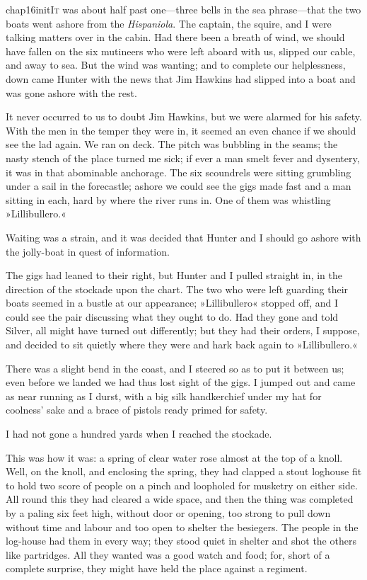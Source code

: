 
\lettrine[lines=5,image=true,findent=2pt]{chap16initI}{t} was about half past one—three bells in the sea phrase—that the two boats went ashore from the \textit{Hispaniola}. The captain, the squire, and I were talking matters over in the cabin. Had there been a breath of wind, we should have fallen on the six mutineers who were left aboard with us, slipped our cable, and away to sea. But the wind was wanting; and to complete our helplessness, down came Hunter with the news that Jim Hawkins had slipped into a boat and was gone ashore with the rest.

It never occurred to us to doubt Jim Hawkins, but we were alarmed for his safety. With the men in the temper they were in, it seemed an even chance if we should see the lad again. We ran on deck. The pitch was bubbling in the seams; the nasty stench of the place turned me sick; if ever a man smelt fever and dysentery, it was in that abominable anchorage. The six scoundrels were sitting grumbling under a sail in the forecastle; ashore we could see the gigs made fast and a man sitting in each, hard by where the river runs in. One of them was whistling »Lillibullero.«

Waiting was a strain, and it was decided that Hunter and I should go ashore with the jolly-boat in quest of information.

The gigs had leaned to their right, but Hunter and I pulled straight in, in the direction of the stockade upon the chart. The two who were left guarding their boats seemed in a bustle at our appearance; »Lillibullero« stopped off, and I could see the pair discussing what they ought to do. Had they gone and told Silver, all might have turned out differently; but they had their orders, I suppose, and decided to sit quietly where they were and hark back again to »Lillibullero.«

There was a slight bend in the coast, and I steered so as to put it between us; even before we landed we had thus lost sight of the gigs. I jumped out and came as near running as I durst, with a big silk handkerchief under my hat for coolness' sake and a brace of pistols ready primed for safety.

I had not gone a hundred yards when I reached the stockade.

This was how it was: a spring of clear water rose almost at the top of a knoll. Well, on the knoll, and enclosing the spring, they had clapped a stout loghouse fit to hold two score of people on a pinch and loopholed for musketry on either side. All round this they had cleared a wide space, and then the thing was completed by a paling six feet high, without door or opening, too strong to pull down without time and labour and too open to shelter the besiegers. The people in the log-house had them in every way; they stood quiet in shelter and shot the others like partridges. All they wanted was a good watch and food; for, short of a complete surprise, they might have held the place against a regiment.

